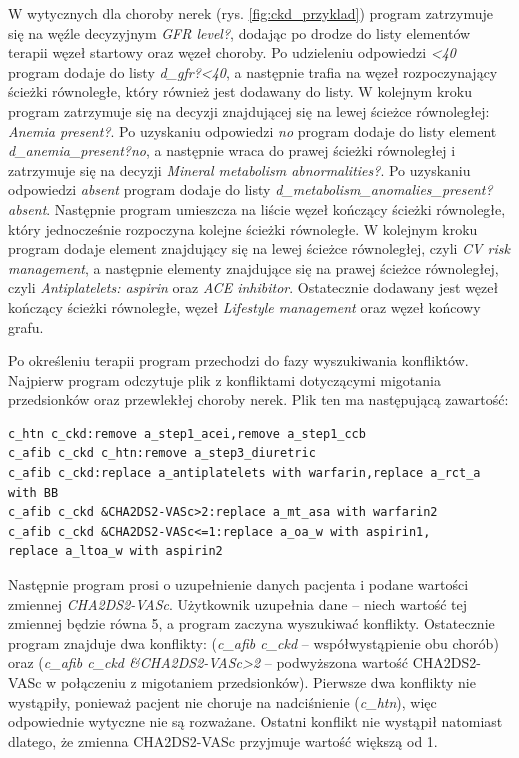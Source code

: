 W wytycznych dla choroby nerek (rys. \ref{fig:ckd_przyklad}) program zatrzymuje się na węźle decyzyjnym \textit{GFR level?}, dodając po drodze do listy elementów terapii węzeł startowy oraz węzeł choroby. Po udzieleniu odpowiedzi \textit{<40} program dodaje do listy \textit{d\_gfr?<40}, a następnie trafia na węzeł rozpoczynający ścieżki równoległe, który również jest dodawany do listy. W kolejnym kroku program zatrzymuje się na  decyzji znajdującej się na lewej ścieżce równoległej: \textit{Anemia present?}. Po uzyskaniu odpowiedzi \textit{no} program dodaje do listy element \textit{d\_anemia\_present?no}, a następnie wraca do prawej ścieżki równoległej i zatrzymuje się na decyzji \textit{Mineral metabolism abnormalities?}. Po uzyskaniu odpowiedzi \textit{absent} program dodaje do listy \textit{d\_metabolism\_anomalies\_present?absent}. Następnie program umieszcza na liście węzeł kończący ścieżki równoległe, który jednocześnie rozpoczyna kolejne ścieżki równoległe. W kolejnym kroku program dodaje element znajdujący się na lewej ścieżce równoległej, czyli \textit{CV risk management}, a następnie elementy znajdujące się na prawej ścieżce równoległej, czyli \textit{Antiplatelets: aspirin} oraz \textit{ACE inhibitor}. Ostatecznie dodawany jest węzeł kończący ścieżki równoległe, węzeł \textit{Lifestyle management} oraz węzeł końcowy grafu.

Po określeniu terapii program przechodzi do fazy wyszukiwania konfliktów. 
Najpierw program odczytuje plik z konfliktami dotyczącymi migotania przedsionków oraz przewlekłej choroby nerek. Plik ten ma następującą zawartość:
\begin{verbatim}
c_htn c_ckd:remove a_step1_acei,remove a_step1_ccb
c_afib c_ckd c_htn:remove a_step3_diuretric
c_afib c_ckd:replace a_antiplatelets with warfarin,replace a_rct_a with BB
c_afib c_ckd &CHA2DS2-VASc>2:replace a_mt_asa with warfarin2
c_afib c_ckd &CHA2DS2-VASc<=1:replace a_oa_w with aspirin1,
replace a_ltoa_w with aspirin2
\end{verbatim}
Następnie program prosi o uzupełnienie danych pacjenta i podane wartości zmiennej \textit{CHA2\-DS2-VASc}. Użytkownik uzupełnia dane -- niech wartość tej zmiennej będzie równa 5, a program zaczyna wyszukiwać konflikty. Ostatecznie program znajduje dwa konflikty: (\textit{c\_afib c\_ckd} -- współwystąpienie obu chorób) oraz (\textit{c\_afib c\_ckd \&CHA2DS2-VASc>2} -- podwyższona wartość CHA2DS2-VASc w połączeniu z migotaniem przedsionków). Pierwsze dwa konflikty nie wystąpiły, ponieważ pacjent nie choruje na nadciśnienie (\textit{c\_htn}), więc odpowiednie wytyczne nie są rozważane. Ostatni konflikt nie wystąpił natomiast dlatego, że zmienna CHA2DS2-VASc przyjmuje wartość większą od 1.

